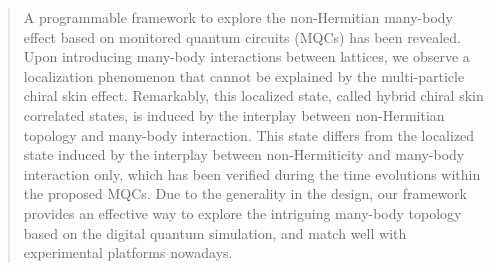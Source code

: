\documentclass[longbibliography, aps, prx, amsmath, amssymb, amsfonts, twocolumn,superscriptaddress, footinbib]{revtex4-1}
\begin{document}
	
	
	
	\begin{abstract}

		A programmable framework to explore the non-Hermitian many-body effect based on monitored quantum circuits (MQCs) has been revealed. Upon introducing many-body interactions between lattices, we observe a localization phenomenon that cannot be explained by the multi-particle chiral skin effect. Remarkably, this localized state, called hybrid chiral skin correlated states, is induced by the interplay between non-Hermitian topology and many-body interaction. This state differs from the localized state induced by the interplay between non-Hermiticity and many-body interaction only, which has been verified during the time evolutions within the proposed MQCs. Due to the generality in the design, our framework provides an effective way to explore the intriguing many-body topology based on the digital quantum simulation, and match well with experimental platforms nowadays. 

        



\end{abstract}
\end{document}
